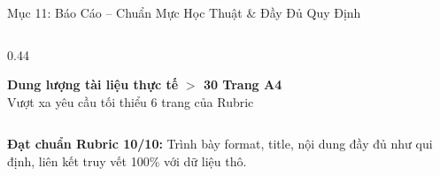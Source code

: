 \begin{frame}{Mục 11: Báo Cáo -- Chuẩn Mực Học Thuật \& Đầy Đủ Quy Định}
\begin{columns}[T]
\begin{column}{0.44\textwidth}
      \vspace{-1mm}
      \begin{alertblock}{\centering \scriptsize \textbf{Dung lượng tài liệu thực tế}}
        \centering \vspace{0.3mm}
        {\large \textbf{\color{PetcareSuccess}$>$ 30 Trang A4}}\\[0.3mm]
        {\tiny Vượt xa yêu cầu tối thiểu 6 trang của Rubric}
      \end{alertblock}
    \end{column}
  \end{columns}

  \vspace{1mm}
  \begin{center}
    \tiny \color{PetcarePrimary}
    \textbf{Đạt chuẩn Rubric 10/10:} Trình bày format, title, nội dung đầy đủ như qui định, liên kết truy vết 100\% với dữ liệu thô.
  \end{center}
\end{frame}
